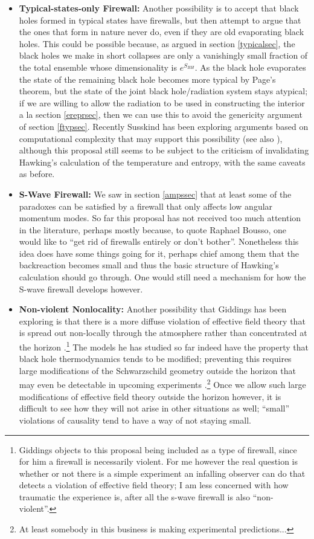 \documentclass[12pt]{article}
\begin{document}
\begin{itemize}
\item \textbf{Typical-states-only Firewall:} Another possibility is to accept that black holes formed in typical states have firewalls, but then attempt to argue that the ones that form in nature never do, even if they are old evaporating black holes.  This could be possible because, as argued in section \ref{typicalsec}, the black holes we make in short collapses are only a vanishingly small fraction of the total ensemble whose dimensionality is $e^{S_{BH}}$.  As the black hole evaporates the state of the remaining black hole becomes more typical by Page's theorem, but the state of the joint black hole/radiation system stays atypical; if we are willing to allow the radiation to be used in constructing the interior a la section \ref{ereprsec}, then we can use this to avoid the genericity argument of section \ref{ftypsec}.  Recently Susskind has been exploring arguments based on computational complexity that may support this possibility \cite{Susskind:2014rva} (see also \cite{Stanford:2014jda,Susskind:2014jwa}), although this proposal still seems to be subject to the criticism of invalidating Hawking's calculation of the temperature and entropy, with the same caveats as before.  
\item \textbf{S-Wave Firewall:} We saw in section \ref{ampssec} that at least some of the paradoxes can be satisfied by a firewall that only affects low angular momentum modes.  So far this proposal has not received too much attention in the literature, perhaps mostly because, to quote Raphael Bousso, one would like to ``get rid of firewalls entirely or don't bother''.  Nonetheless this idea does have some things going for it, perhaps chief among them that the backreaction becomes small and thus the basic structure of Hawking's calculation should go through.  One would still need a mechanism for how the S-wave firewall develops however.
\item \textbf{Non-violent Nonlocality:}  Another possibility that Giddings has been exploring is that there is a more diffuse violation of effective field theory that is spread out non-locally through the atmosphere rather than concentrated at the horizon \cite{Giddings:2012gc,Giddings:2013noa}.\footnote{Giddings objects to this proposal being included as a type of firewall, since for him a firewall is necessarily violent.  For me however the real question is whether or not there is a simple experiment an infalling observer can do that detects a violation of effective field theory; I am less concerned with how traumatic the experience is, after all the s-wave firewall is also ``non-violent''.}  The models he has studied so far indeed have the property that black hole thermodynamics tends to be modified; preventing this requires large modifications of the Schwarzschild geometry outside the horizon that may even be detectable in upcoming experiments \cite{Almheiri:2013hfa,Giddings:2013vda,Giddings:2014ova}.\footnote{At least somebody in this business is making experimental predictions...}  Once we allow such large modifications of effective field theory outside the horizon however, it is difficult to see how they will not arise in other situations as well; ``small'' violations of causality tend to have a way of not staying small.  

\end{itemize}
\end{document}
